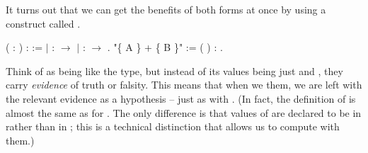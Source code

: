 \documentclass[12pt]{report}
\begin{document}
 It turns out that we can get the benefits of both forms at once by
    using a construct called . \begin{coqdoccode}
\coqdocemptyline
\coqdocnoindent
{}  (  : ) :  :=\coqdoceol
\coqdocindent{0.50em}
\ensuremath{|}  :  \ensuremath{\rightarrow}    \coqdoceol
\coqdocindent{0.50em}
\ensuremath{|}  :  \ensuremath{\rightarrow}   .\coqdoceol
\coqdocemptyline
\coqdocnoindent
{} "\{ A \} + \{ B \}" :=  (  ) : .\coqdoceol
\coqdocemptyline
\end{coqdoccode}
Think of  as being like the  type, but instead
    of its values being just  and , they carry \textit{evidence}
    of truth or falsity. This means that when we  them, we
    are left with the relevant evidence as a hypothesis -- just as
    with .  (In fact, the definition of  is almost the
    same as for .  The only difference is that values of 
    are declared to be in  rather than in ; this is a
    technical distinction that allows us to compute with them.) 

\subsubsection{ }
\end{document}
